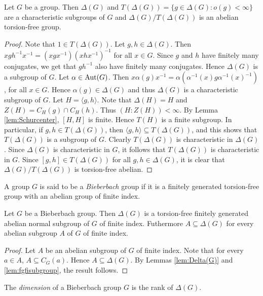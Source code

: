 \begin{lemma}\label{lem:Delta(G)}
Let $G$ be a group. Then $\Delta(G)$ and $T(\Delta(G))=\{ g\in\Delta(G) : o(g)<\infty\}$
are a characteristic  subgroups of $G$ and $\Delta(G)/T(\Delta(G))$ is an abelian torsion-free group.
\end{lemma}

\begin{proof}
Note that $1\in T(\Delta(G))$. Let $g,h\in \Delta(G)$. Then $xgh^{-1}x^{-1}=(xgx^{-1})(xhx^{-1})^{-1}$ for all $x\in G$. Since $g$ and $h$ have finitely many conjugates, we get that $gh^{-1}$ also have finitely many conjugates.  Hence $\Delta(G)$ is a subgroup of $G$. Let $\alpha\in \operatorname{Aut}(G)$. Then $x\alpha(g)x^{-1}=\alpha(\alpha^{-1}(x)g\alpha^{-1}(x)^{-1})$, for all $x\in G$. Hence $\alpha(g)\in \Delta(G)$ and thus $\Delta(G)$ is a characteristic subgroup of $G$. Let $H=\langle g,h\rangle$. Note that $\Delta(H)=H$ and $Z(H)=C_H(g)\cap C_H(h)$. Thus $(H:Z(H))<\infty$. By Lemma \ref{lem:Schurcenter}, $[H,H]$ is finite. Hence $T(H)$ is a finite subgroup. In particular, if $g,h\in T(\Delta(G))$, then $\langle g,h\rangle\subseteq T(\Delta(G))$, and this shows that $T(\Delta(G))$ is a subgroup of $G$. Clearly $T(\Delta(G))$ is characteristic in $\Delta(G)$. Since $\Delta (G)$ is characteristic in $G$, it follows that $T(\Delta(G))$ is characteristic in $G$. Since $[g,h]\in T(\Delta(G))$ for all $g,h\in \Delta(G)$, it is clear that $\Delta(G)/T(\Delta(G))$ is torsion-free abelian.  
\end{proof}

A group $G$ is said to be a {\em Bieberbach} group if it is a finitely generated torsion-free group with an abelian group of finite index.


\begin{proposition}\label{prop:Bieberbach2}
Let $G$ be a Bieberbach group. Then $\Delta(G)$ is a torsion-free finitely generated abelian normal subgroup of $G$ of finite index. Futhermore $A\subseteq \Delta(G)$ for every abelian subgroup $A$ of $G$ of finite index.
\end{proposition}

\begin{proof}
Let $A$ be an abelian subgroup of $G$ of finite index. Note that for every $a\in A$, $A\subseteq C_G(a)$. Hence $A\subseteq \Delta(G)$. By Lemmas \ref{lem:Delta(G)} and \ref{lem:fgfisubgroup},  the result follows. 
\end{proof}

The {\em dimension} of a Bieberbach group $G$ is the rank of $\Delta(G)$.

